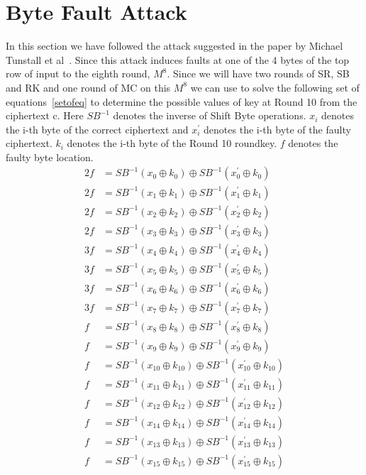 \documentclass{article}
\begin{document}
\section{Byte Fault Attack}
In this section we have followed the attack suggested in the paper by Michael Tunstall et al~\cite{tunstall2011differential}. Since this attack induces faults at one of the 4 bytes of the top row of input to the eighth round, $M^8$. Since we will have two rounds of SR, SB and RK and one round of MC on this $M^8$ we can use to solve the following set of equations~\ref{setofeq} to determine the possible values of key at Round 10 from the ciphertext c. Here $SB^{-1}$ denotes the inverse of Shift Byte operations. $x_i$ denotes the i-th byte of the correct ciphertext and $x^\prime_i$ denotes the i-th byte of the faulty ciphertext. $k_i$ denotes the i-th byte of the Round 10 roundkey. $f$ denotes the faulty byte location. 
\begin{equation}
\begin{aligned}
2f &= SB^{-1}(x_0 \oplus k_0) \oplus SB^{-1}(x^\prime_0 \oplus k_0)\\
2f &= SB^{-1}(x_1 \oplus k_1) \oplus SB^{-1}(x^\prime_1 \oplus k_1)\\
2f &= SB^{-1}(x_2 \oplus k_2) \oplus SB^{-1}(x^\prime_2 \oplus k_2)\\
2f &= SB^{-1}(x_3 \oplus k_3) \oplus SB^{-1}(x^\prime_3 \oplus k_3)\\
3f &= SB^{-1}(x_4 \oplus k_4) \oplus SB^{-1}(x^\prime_4 \oplus k_4)\\
3f &= SB^{-1}(x_5 \oplus k_5) \oplus SB^{-1}(x^\prime_5 \oplus k_5)\\
3f &= SB^{-1}(x_6 \oplus k_6) \oplus SB^{-1}(x^\prime_6 \oplus k_6)\\
3f &= SB^{-1}(x_7 \oplus k_7) \oplus SB^{-1}(x^\prime_7 \oplus k_7)\\
f &= SB^{-1}(x_8 \oplus k_8) \oplus SB^{-1}(x^\prime_8 \oplus k_8)\\
f &= SB^{-1}(x_9 \oplus k_9) \oplus SB^{-1}(x^\prime_9 \oplus k_9)\\
f &= SB^{-1}(x_{10} \oplus k_{10}) \oplus SB^{-1}(x^\prime_{10} \oplus k_{10})\\
f &= SB^{-1}(x_{11} \oplus k_{11}) \oplus SB^{-1}(x^\prime_{11} \oplus k_{11})\\
f &= SB^{-1}(x_{12} \oplus k_{12}) \oplus SB^{-1}(x^\prime_{12} \oplus k_{12})\\
f &= SB^{-1}(x_{14} \oplus k_{14}) \oplus SB^{-1}(x^\prime_{14} \oplus k_{14})\\
f &= SB^{-1}(x_{13 }\oplus k_{13}) \oplus SB^{-1}(x^\prime_{13} \oplus k_{13})\\
f &= SB^{-1}(x_{15} \oplus k_{15}) \oplus SB^{-1}(x^\prime_{15} \oplus k_{15})\label{setofeq}
\end{aligned} 
\end{equation}
\end{document}
